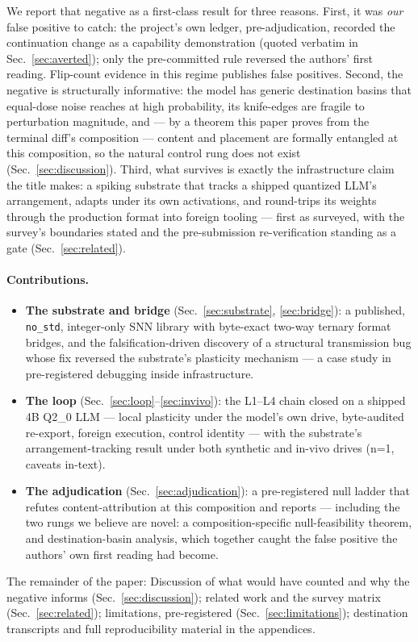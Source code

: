 We report that negative as a first-class result for three reasons.
First, it was \emph{our} false positive to catch: the project's own
ledger, pre-adjudication, recorded the continuation change as a
capability demonstration (quoted verbatim in
Sec.~\ref{sec:averted}); only the pre-committed rule reversed the
authors' first reading. Flip-count evidence in this regime publishes
false positives. Second, the negative is structurally informative:
the model has generic destination basins that equal-dose noise
reaches at high probability, its knife-edges are fragile to
perturbation magnitude, and --- by a theorem this paper proves from
the terminal diff's composition --- content and placement are
formally entangled at this composition, so the natural control rung
does not exist (Sec.~\ref{sec:discussion}). Third, what survives is
exactly the infrastructure claim the title makes: a spiking substrate
that tracks a shipped quantized LLM's arrangement, adapts under its
own activations, and round-trips its weights through the production
format into foreign tooling --- first as surveyed, with the survey's
boundaries stated and the pre-submission re-verification standing as
a gate (Sec.~\ref{sec:related}).

\paragraph{Contributions.}
\begin{itemize}
\item \textbf{The substrate and bridge} (Sec.~\ref{sec:substrate},
  \ref{sec:bridge}): a published, \texttt{no\_std}, integer-only SNN
  library with byte-exact two-way ternary format bridges, and the
  falsification-driven discovery of a structural transmission bug
  whose fix reversed the substrate's plasticity mechanism ---
  a case study in pre-registered debugging inside infrastructure.
\item \textbf{The loop} (Sec.~\ref{sec:loop}--\ref{sec:invivo}): the
  L1--L4 chain closed on a shipped 4B Q2\_0 LLM --- local plasticity
  under the model's own drive, byte-audited re-export, foreign
  execution, control identity --- with the substrate's
  arrangement-tracking result under both synthetic and in-vivo drives
  (n=1, caveats in-text).
\item \textbf{The adjudication} (Sec.~\ref{sec:adjudication}): a
  pre-registered null ladder that refutes content-attribution at this
  composition and reports \unattrib{} --- including the two rungs we
  believe are novel: a composition-specific null-feasibility theorem,
  and destination-basin analysis, which together caught the false
  positive the authors' own first reading had become.
\end{itemize}

The remainder of the paper: Discussion of what would have counted and
why the negative informs (Sec.~\ref{sec:discussion}); related work and
the survey matrix (Sec.~\ref{sec:related}); limitations, pre-registered
(Sec.~\ref{sec:limitations}); destination transcripts and full
reproducibility material in the appendices.

